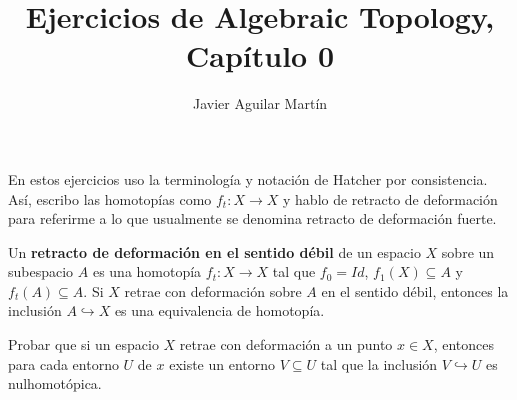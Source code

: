 \documentclass[twoside]{article}
\begin{document}
\title{Ejercicios de Algebraic Topology, Capítulo 0}
\author{Javier Aguilar Martín}
\maketitle

En estos ejercicios uso la terminología y notación de Hatcher por consistencia. Así, escribo las homotopías como $f_t:X\to X$ y hablo de retracto de deformación para referirme a lo que usualmente se denomina retracto de deformación fuerte. 

\begin{lemma}[Ejercicio 0.4]
Un \textbf{retracto de deformación en el sentido débil} de un espacio $X$ sobre un subespacio $A$ es una homotopía $f_t:X\to X$ tal que $f_0=Id$, $f_1(X)\subseteq A$ y $f_t(A)\subseteq A$. Si $X$ retrae con deformación sobre $A$ en el sentido débil, entonces la inclusión $A\hookrightarrow X$ es una equivalencia de homotopía. 

\end{lemma}



\begin{ejercicio}{0.5}
Probar que si un espacio $X$ retrae con deformación a un punto $x\in X$, entonces para cada entorno $U$ de $x$ existe un entorno $V\subseteq U$ tal que la inclusión $V\hookrightarrow U$ es nulhomotópica.
\end{ejercicio}
\end{document}
